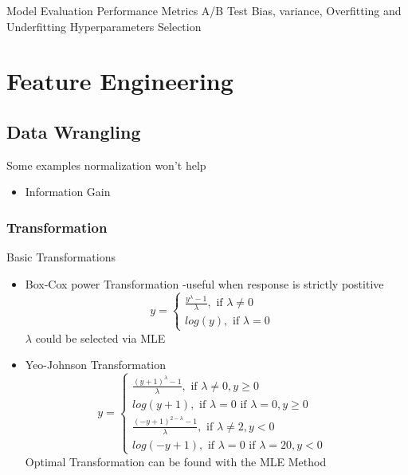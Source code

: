 \documentclass[11pt, openany]{book}              %
\begin{document}
Model Evaluation
	Performance Metrics
	A/B Test
	Bias, variance, Overfitting and Underfitting
	Hyperparameters Selection

\chapter{Feature Engineering}

\section{Data Wrangling}

Some examples normalization won't help

\begin{itemize}
	\item Information Gain
\end{itemize}

\subsection{Transformation}

Basic Transformations

\begin{itemize}
    \item Box-Cox power Transformation -useful when response is strictly postitive
    $$y = \left\{
             \begin{array}{lr}
             \frac{y^\lambda -1}{\lambda}, \text{ if }\lambda \neq 0 &  \\
             log(y), \text{ if }\lambda = 0 &  
             \end{array}
      \right.$$
      $\lambda$ could be selected via MLE
    \item Yeo-Johnson Transformation
     $$y = \left\{
             \begin{array}{lr}
             \frac{(y+1)^\lambda -1}{\lambda}, \text{ if }\lambda \neq 0, y \geq 0 &  \\
             log(y+1), \text{ if }\lambda = 0 \text{ if }\lambda = 0, y \geq 0 &  \\
              \frac{(-y+1)^{2-\lambda} -1}{\lambda}, \text{ if }\lambda \neq 2, y < 0 &  \\
				log(-y+1), \text{ if }\lambda = 0 \text{ if }\lambda =2 0, y < 0 & 
			  
             \end{array}
      \right.$$ Optimal Transformation can be found with the MLE Method
\end{itemize}
\end{document}
